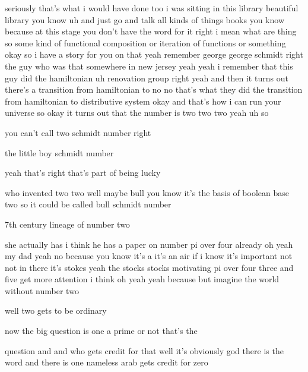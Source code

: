 \begin{description}
seriously that's what i would have done too i was sitting in this library beautiful library you know uh and just go and talk all kinds of things books you know because at this stage you don't have the word for it right i mean what are thing so some kind of functional composition or iteration of functions or something okay so i have a story for you on that yeah remember george george schmidt right the guy who was that somewhere in new jersey yeah yeah i remember that this guy did the hamiltonian uh renovation group right yeah and then it turns out there's a transition from hamiltonian to no no that's what they did the transition from hamiltonian to distributive system okay and that's how i can run your universe so okay it turns out that the number is two two two yeah uh so

you can't call two schmidt number right

the little boy schmidt number

yeah that's right that's part of being lucky

who invented two two well maybe bull you know it's the basis of boolean base two so it could be called bull schmidt number

7th century lineage of number two

she actually has i think he has a paper on number pi over four already oh yeah my dad yeah no because you know it's a it's an air if i know it's important not not in there it's stokes yeah the stocks stocks motivating pi over four three and five get more attention i think oh yeah yeah because but imagine the world without number two

well two gets to be ordinary

now the big question is one a prime or not that's the

question and and who gets credit for that well it's obviously god there is the word and there is one nameless arab gets credit for zero


\end{description}
